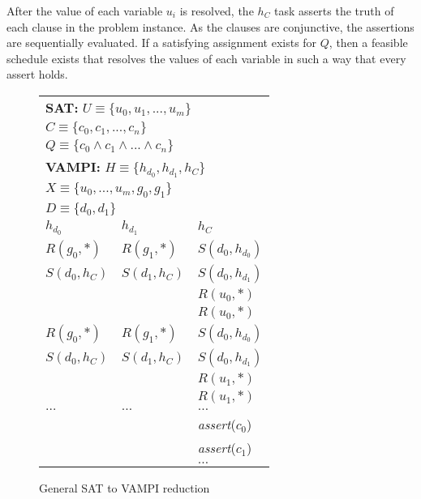After the value of each variable $u_i$ is resolved, the $h_C$ task asserts
the truth of each clause in the problem instance. As the clauses are conjunctive, the assertions
are sequentially evaluated. If a satisfying assignment exists for $Q$,
then a feasible schedule exists that resolves the values of each
variable in such a way that every assert holds.

\begin{figure}
\begin{center}
\setlength{\tabcolsep}{2pt}
\begin{tabular}[t]{|l|l|l|}
\hline
\multicolumn{3}{|l|}{\textbf{SAT:} $\mathit{U\equiv\{u_0,u_1,...,u_m\}}$}\\
              \multicolumn{3}{|l|}{$\mathit{C\equiv\{c_0,c_1,...,c_n\}}$}\\
              \multicolumn{3}{|l|}{$\mathit{Q\equiv\{c_0\wedge c_1\wedge ...\wedge c_n\}}$}\\
\hline
\multicolumn{3}{|l|}{\textbf{VAMPI:} $\mathit{H\equiv\{h_{d_0},h_{d_1},h_{C}\}}$}\\
                \multicolumn{3}{|l|}{$\mathit{X\equiv\{u_0,...,u_m,g_0,g_1\}}$}\\
                \multicolumn{3}{|l|}{$\mathit{D\equiv\{d_0,d_1\}}$}\\
\hline
$h_{d_0}$ & $h_{d_1}$ & $h_C$ \\
\hline
$R(g_{0},*)$   & $R(g_{1},*)$   & $S(d_0,h_{d_0})$ \\
$S(d_{0},h_C)$ & $S(d_{1},h_C)$ & $S(d_0,h_{d_1})$ \\
              &                & $R(u_0,*)$        \\
              &                & $R(u_0,*)$        \\
\hline
$R(g_{0},*)$  &  $R(g_{1},*)$   & $S(d_0,h_{d_0})$ \\
$S(d_{0},h_C)$&  $S(d_{1},h_C)$ & $S(d_0,h_{d_1})$ \\
              &                & $R(u_1,*)$       \\
              &                & $R(u_1,*)$       \\
\hline
$\ldots$      &  $\ldots$      & $\ldots$                \\
\hline
              &                & \textit{assert}($c_0$) \\
              &                & \textit{assert}($c_1$) \\
              &                & $\ldots$ \\
\hline
\end{tabular}
\end{center}
\caption{General SAT to VAMPI reduction}
\label{fig:vampi}
\end{figure}

